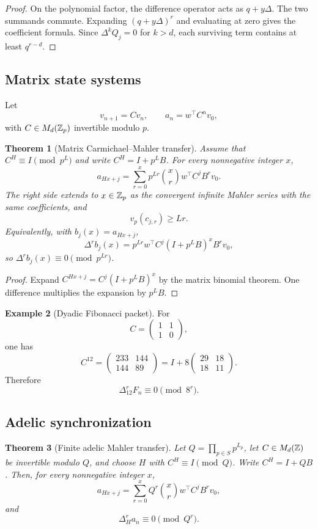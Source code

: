 \documentclass[11pt]{article}
\newtheorem{theorem}{Theorem}[section]\newtheorem{proposition}[theorem]{Proposition}\newtheorem{lemma}[theorem]{Lemma}\newtheorem{corollary}[theorem]{Corollary}
\theoremstyle{definition}\newtheorem{definition}[theorem]{Definition}\newtheorem{example}[theorem]{Example}\newtheorem{construction}[theorem]{Construction}\newtheorem{algorithm}[theorem]{Algorithm}\newtheorem{conjecture}[theorem]{Conjecture}\newtheorem{problem}[theorem]{Problem}
\theoremstyle{remark}\newtheorem{remark}[theorem]{Remark}\newtheorem{boundary}[theorem]{Boundary}\newtheorem{certificate}[theorem]{Computational Certificate}\newtheorem{classical}[theorem]{Classical Input}\newtheorem{principle}[theorem]{Structural Principle}
\begin{document}
\begin{proof}
On the polynomial factor, the difference operator acts as $q+y\Delta$. The two summands commute. Expanding $(q+y\Delta)^r$ and evaluating at zero gives the coefficient formula. Since $\Delta^kQ_j=0$ for $k>d$, each surviving term contains at least $q^{r-d}$.
\end{proof}

\subsection{Matrix state systems}
Let
\[
 v_{n+1}=Cv_n,\qquad a_n=w^\top C^nv_0,
\]
with $C\in M_d(\mathbb Z_p)$ invertible modulo $p$.

\begin{theorem}[Matrix Carmichael--Mahler transfer]
Assume that $C^H\equiv I\pmod{p^L}$ and write $C^H=I+p^LB$. For every nonnegative integer $x$,
\[
 \boxed{a_{Hx+j}=\sum_{r=0}^{x}p^{Lr}\binom xr w^\top C^jB^rv_0.}
\]
The right side extends to $x\in\mathbb Z_p$ as the convergent infinite Mahler series with the same coefficients, and
\[
 \boxed{v_p(c_{j,r})\geq Lr.}
\]
Equivalently, with $b_j(x)=a_{Hx+j}$,
\[
 \boxed{\Delta^rb_j(x)=p^{Lr}w^\top C^j(I+p^LB)^xB^rv_0,}
\]
so $\Delta^rb_j(x)\equiv0\pmod{p^{Lr}}$.
\end{theorem}

\begin{proof}
Expand $C^{Hx+j}=C^j(I+p^LB)^x$ by the matrix binomial theorem. One difference multiplies the expansion by $p^LB$.
\end{proof}

\begin{example}[Dyadic Fibonacci packet]
For
\[
 C=\begin{pmatrix}1&1\\1&0\end{pmatrix},
\]
one has
\[
 C^{12}=\begin{pmatrix}233&144\\144&89\end{pmatrix}
 =I+8\begin{pmatrix}29&18\\18&11\end{pmatrix}.
\]
Therefore
\[
 \boxed{\Delta_{12}^rF_n\equiv0\pmod{8^r}.}
\]
\end{example}

\subsection{Adelic synchronization}
\begin{theorem}[Finite adelic Mahler transfer]
Let $Q=\prod_{p\in S}p^{L_p}$, let $C\in M_d(\mathbb Z)$ be invertible modulo $Q$, and choose $H$ with $C^H\equiv I\pmod Q$. Write $C^H=I+QB$. Then, for every nonnegative integer $x$,
\[
 \boxed{a_{Hx+j}=\sum_{r=0}^{x}Q^r\binom xr w^\top C^jB^rv_0,}
\]
and
\[
 \boxed{\Delta_H^ra_n\equiv0\pmod{Q^r}.}
\]
\end{theorem}
\end{document}
